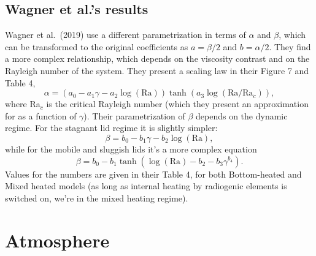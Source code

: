 \documentclass[12pt,notitlepage]{article}
\begin{document}
\subsection{Wagner et al.'s results}
Wagner et al.\ (2019) use a different parametrization in terms of $\alpha$ and $\beta$, which can be transformed to the original coefficients as $a = \beta/2$ and $b=\alpha/2$. They find a more complex relationship, which depends on the viscosity contrast and on the Rayleigh number of the system. They present a scaling law in their Figure 7 and Table 4,
\begin{equation}
\alpha = \left( a_0 - a_1 \gamma - a_2 \log(\text{Ra}) \right) \tanh \left( a_3 \log (\text{Ra}/\text{Ra}_c) \right),
\end{equation}
where Ra$_c$ is the critical Rayleigh number (which they present an approximation for as a function of $\gamma$). Their parametrization of $\beta$ depends on the dynamic regime. For the stagnant lid regime it is slightly simpler:
\begin{equation}
\beta = b_0 - b_1 \gamma - b_2 \log (\text{Ra}),
\end{equation}
while for the mobile and sluggish lids it's a more complex equation
\begin{equation}
\beta = b_0 - b_1  \tanh \left( \log(\text{Ra}) - b_2 - b_3 \gamma^{b_4} \right).
\end{equation}
Values for the numbers are given in their Table 4, for both Bottom-heated and Mixed heated models (as long as internal heating by radiogenic elements is switched on, we're in the mixed heating regime).

%

%

%

\section{Atmosphere}

\end{document}
